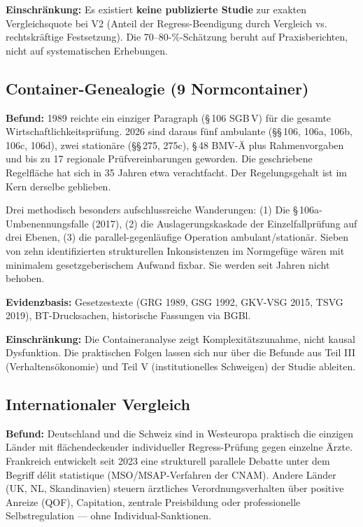 \documentclass{umbruch-position}
\begin{document}
\textbf{Einschr\"ankung:} Es existiert \textbf{keine publizierte Studie} zur exakten Vergleichsquote bei V2 (Anteil der Regress-Beendigung durch Vergleich vs. rechtskr\"aftige Festsetzung). Die 70--80-\%-Sch\"atzung beruht auf Praxisberichten, nicht auf systematischen Erhebungen.

\subsection{Container-Genealogie (9 Normcontainer)}

\textbf{Befund:} 1989 reichte ein einziger Paragraph (\S\,106 SGB\,V) f\"ur die gesamte Wirtschaftlichkeitspr\"ufung. 2026 sind daraus f\"unf ambulante (\S\S\,106, 106a, 106b, 106c, 106d), zwei station\"are (\S\S\,275, 275c), \S\,48 BMV-\"A plus Rahmenvorgaben und bis zu 17 regionale Pr\"ufvereinbarungen geworden. Die geschriebene Regelfl\"ache hat sich in 35 Jahren etwa verachtfacht. Der Regelungsgehalt ist im Kern derselbe geblieben.

Drei methodisch besonders aufschlussreiche Wanderungen: (1) Die \S\,106a-Umbenennungsfalle (2017), (2) die Auslagerungskaskade der Einzelfallpr\"ufung auf drei Ebenen, (3) die parallel-gegenl\"aufige Operation ambulant/station\"ar. Sieben von zehn identifizierten strukturellen Inkonsistenzen im Normgef\"uge w\"aren mit minimalem gesetzgeberischem Aufwand fixbar. Sie werden seit Jahren nicht behoben.

\textbf{Evidenzbasis:} Gesetzestexte (GRG 1989, GSG 1992, GKV-VSG 2015, TSVG 2019), BT-Drucksachen, historische Fassungen via BGBl.

\textbf{Einschr\"ankung:} Die Containeranalyse zeigt Komplexit\"atszunahme, nicht kausal Dysfunktion. Die praktischen Folgen lassen sich nur \"uber die Befunde aus Teil III (Verhaltens\"okonomie) und Teil V (institutionelles Schweigen) der Studie ableiten.

\subsection{Internationaler Vergleich}

\textbf{Befund:} Deutschland und die Schweiz sind in Westeuropa praktisch die einzigen L\"ander mit fl\"achendeckender individueller Regress-Pr\"ufung gegen einzelne \"Arzte. Frankreich entwickelt seit 2023 eine strukturell parallele Debatte unter dem Begriff \glqq{}d\'elit statistique\grqq{} (MSO/MSAP-Verfahren der CNAM). Andere L\"ander (UK, NL, Skandinavien) steuern \"arztliches Verordnungsverhalten \"uber positive Anreize (QOF), Capitation, zentrale Preisbildung oder professionelle Selbstregulation --- ohne Individual-Sanktionen.
\end{document}
